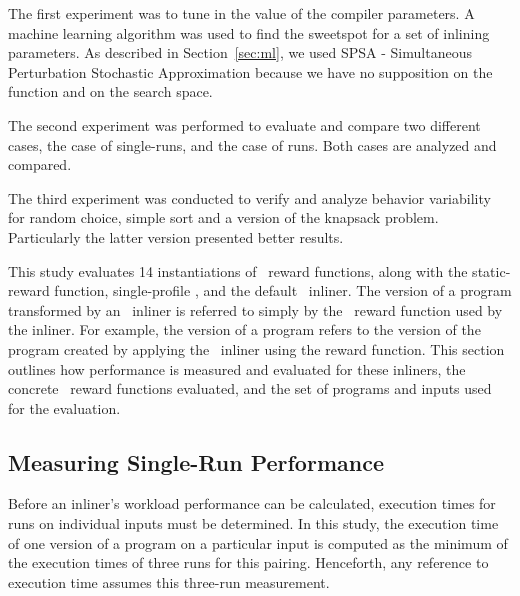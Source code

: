 
\def\graphwidth{0.9\linewidth}



The first experiment was to tune in the value of the compiler parameters.
 A machine learning algorithm was used to find the sweetspot for a set of
 inlining parameters. As described in Section~\ref{sec:ml}, we used
 SPSA - Simultaneous Perturbation Stochastic Approximation because we have no
 supposition on the function and on the search space.

The second experiment was performed to evaluate and compare two different cases,
 the case of single-runs, and the case of \CP\-runs. Both cases are analyzed and
 compared.

The third experiment was conducted to verify and 
  analyze behavior variability for random choice, simple sort and
  a version of the knapsack problem. Particularly the latter version presented better results.


This study evaluates 14 instantiations of \FDI\ reward functions,
along with the  static-reward function,
single-profile \FDO, and the default \llvm\ inliner.  The version of a
program transformed by an \FDI\ inliner is referred to simply by
the \FDI\ reward function used by the inliner.  For example,
the  version of a program refers to the version of the
program created by applying the \FDI\ inliner using
the  reward function.  This section outlines how
performance is measured and evaluated for these inliners, the
concrete \FDI\ reward functions evaluated, and the set of programs and
inputs used for the evaluation.


\subsection{Measuring Single-Run Performance}

Before an inliner's workload performance can be calculated, execution
times for runs on individual inputs must be determined.  In this
study, the execution time of one version of a program on a particular
input is computed as the 
minimum of the execution times of three runs for this pairing.
Henceforth, any reference to execution time assumes this three-run
measurement.

